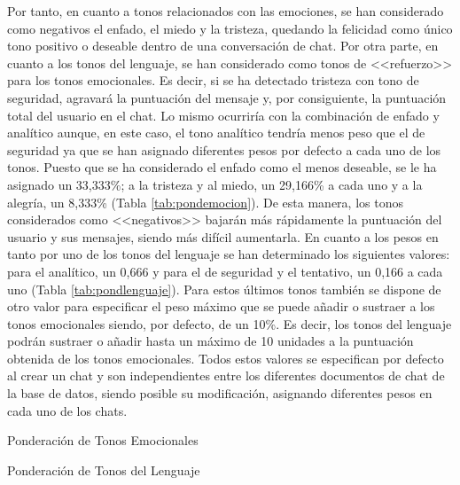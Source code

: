 \clearpage

Por tanto, en cuanto a tonos relacionados con las emociones, se han considerado como negativos el enfado, el miedo y la tristeza, quedando la felicidad como único tono positivo o deseable dentro de una conversación de chat. Por otra parte, en cuanto a los tonos del lenguaje, se han considerado como tonos de <<refuerzo>> para los tonos emocionales. Es decir, si se ha detectado tristeza con tono de seguridad, agravará la puntuación del mensaje y, por consiguiente, la puntuación total del usuario en el chat. Lo mismo ocurriría con la combinación de enfado y analítico aunque, en este caso, el tono analítico tendría menos peso que el de seguridad ya que se han asignado diferentes pesos por defecto a cada uno de los tonos. Puesto que se ha considerado el enfado como el menos deseable, se le ha asignado un 33,333\%; a la tristeza y al miedo, un 29,166\% a cada uno y a la alegría, un 8,333\% (Tabla \ref{tab:pondemocion}). De esta manera, los tonos considerados como <<negativos>> bajarán más rápidamente la puntuación del usuario y sus mensajes, siendo más difícil aumentarla. En cuanto a los pesos en tanto por uno de los tonos del lenguaje se han determinado los siguientes valores: para el analítico, un 0,666 y para el de seguridad y el tentativo, un 0,166 a cada uno (Tabla \ref{tab:pondlenguaje}). Para estos últimos tonos también se dispone de otro valor para especificar el peso máximo que se puede añadir o sustraer a los tonos emocionales siendo, por defecto, de un 10\%. Es decir, los tonos del lenguaje podrán sustraer o añadir hasta un máximo de 10 unidades a la puntuación obtenida de los tonos emocionales. Todos estos valores se especifican por defecto al crear un chat y son independientes entre los diferentes documentos de chat de la base de datos, siendo posible su modificación, asignando diferentes pesos en cada uno de los chats.

\begin{table}[!htbp]
	\centering
	{\small
		
	}
	\caption[Ponderación de Tonos Emocionales]
	{Ponderación de Tonos Emocionales}
	\label{tab:pondemocion}
\end{table}

\begin{table}[!htbp]
	\centering
	{\small
		
	}
	\caption[Ponderación de Tonos del Lenguaje]
	{Ponderación de Tonos del Lenguaje}
	\label{tab:pondlenguaje}
\end{table}

\clearpage

